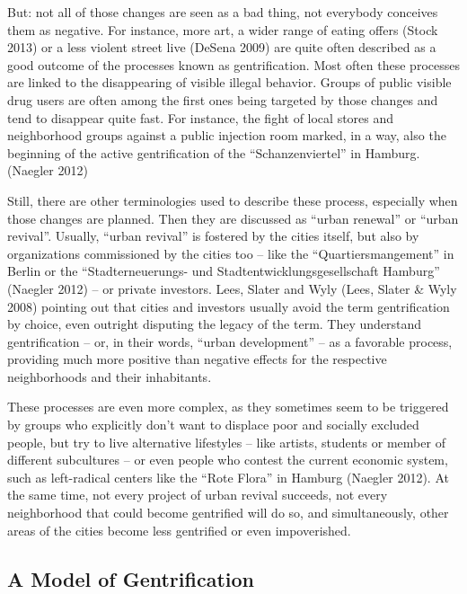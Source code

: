 \documentclass[a4paper,
fontsize=11pt,
oneside,
numbers=noperiodatend,
parskip=half-,
bibliography=totoc,
final
]{scrartcl}
\begin{document}
But: not all of those changes are seen as a bad thing, not everybody
conceives them as negative. For instance, more art, a wider range of
eating offers (Stock 2013) or a less violent street live (DeSena 2009)
are quite often described as a good outcome of the processes known as
gentrification. Most often these processes are linked to the
disappearing of visible illegal behavior. Groups of public visible drug
users are often among the first ones being targeted by those changes and
tend to disappear quite fast. For instance, the fight of local stores
and neighborhood groups against a public injection room marked, in a
way, also the beginning of the active gentrification of the
\enquote{Schanzenviertel} in Hamburg. (Naegler 2012)

Still, there are other terminologies used to describe these process,
especially when those changes are planned. Then they are discussed as
\enquote{urban renewal} or \enquote{urban revival}. Usually,
\enquote{urban revival} is fostered by the cities itself, but also by
organizations commissioned by the cities too -- like the
\enquote{Quartiersmangement} in Berlin or the \enquote{Stadterneuerungs-
und Stadtentwicklungsgesellschaft Hamburg} (Naegler 2012) -- or private
investors. Lees, Slater and Wyly (Lees, Slater \& Wyly 2008) pointing
out that cities and investors usually avoid the term gentrification by
choice, even outright disputing the legacy of the term. They understand
gentrification -- or, in their words, \enquote{urban development} -- as
a favorable process, providing much more positive than negative effects
for the respective neighborhoods and their inhabitants.

These processes are even more complex, as they sometimes seem to be
triggered by groups who explicitly don't want to displace poor and
socially excluded people, but try to live alternative lifestyles -- like
artists, students or member of different subcultures -- or even people
who contest the current economic system, such as left-radical centers
like the \enquote{Rote Flora} in Hamburg (Naegler 2012). At the same
time, not every project of urban revival succeeds, not every
neighborhood that could become gentrified will do so, and
simultaneously, other areas of the cities become less gentrified or even
impoverished.

\subsection{A Model of Gentrification}\label{a-model-of-gentrification}
\end{document}
